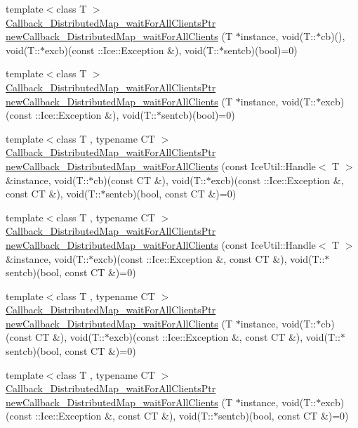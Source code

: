 \begin{DoxyCompactItemize}
\item 
{\footnotesize template$<$class T $>$ }\\\hyperlink{namespace_global_table_a110ac4602b8f6c72aa866923747317e3}{Callback\_\-DistributedMap\_\-waitForAllClientsPtr} \hyperlink{namespace_global_table_ac9ffe632ea55c9e7441c89ffc0d325c8}{newCallback\_\-DistributedMap\_\-waitForAllClients} (T $\ast$instance, void(T::$\ast$cb)(), void(T::$\ast$excb)(const ::Ice::Exception \&), void(T::$\ast$sentcb)(bool)=0)
\item 
{\footnotesize template$<$class T $>$ }\\\hyperlink{namespace_global_table_a110ac4602b8f6c72aa866923747317e3}{Callback\_\-DistributedMap\_\-waitForAllClientsPtr} \hyperlink{namespace_global_table_af0a542865c3fb884c9b5703eb6d9dece}{newCallback\_\-DistributedMap\_\-waitForAllClients} (T $\ast$instance, void(T::$\ast$excb)(const ::Ice::Exception \&), void(T::$\ast$sentcb)(bool)=0)
\item 
{\footnotesize template$<$class T , typename CT $>$ }\\\hyperlink{namespace_global_table_a110ac4602b8f6c72aa866923747317e3}{Callback\_\-DistributedMap\_\-waitForAllClientsPtr} \hyperlink{namespace_global_table_a34e1115638b17b73dc68dc06125520b1}{newCallback\_\-DistributedMap\_\-waitForAllClients} (const IceUtil::Handle$<$ T $>$ \&instance, void(T::$\ast$cb)(const CT \&), void(T::$\ast$excb)(const ::Ice::Exception \&, const CT \&), void(T::$\ast$sentcb)(bool, const CT \&)=0)
\item 
{\footnotesize template$<$class T , typename CT $>$ }\\\hyperlink{namespace_global_table_a110ac4602b8f6c72aa866923747317e3}{Callback\_\-DistributedMap\_\-waitForAllClientsPtr} \hyperlink{namespace_global_table_a200f0daaa6e176e4ee999d685777e3b7}{newCallback\_\-DistributedMap\_\-waitForAllClients} (const IceUtil::Handle$<$ T $>$ \&instance, void(T::$\ast$excb)(const ::Ice::Exception \&, const CT \&), void(T::$\ast$sentcb)(bool, const CT \&)=0)
\item 
{\footnotesize template$<$class T , typename CT $>$ }\\\hyperlink{namespace_global_table_a110ac4602b8f6c72aa866923747317e3}{Callback\_\-DistributedMap\_\-waitForAllClientsPtr} \hyperlink{namespace_global_table_a966c50ca20de1840682fcd9dd03c17a3}{newCallback\_\-DistributedMap\_\-waitForAllClients} (T $\ast$instance, void(T::$\ast$cb)(const CT \&), void(T::$\ast$excb)(const ::Ice::Exception \&, const CT \&), void(T::$\ast$sentcb)(bool, const CT \&)=0)
\item 
{\footnotesize template$<$class T , typename CT $>$ }\\\hyperlink{namespace_global_table_a110ac4602b8f6c72aa866923747317e3}{Callback\_\-DistributedMap\_\-waitForAllClientsPtr} \hyperlink{namespace_global_table_ab578b4a97a1d0a8d8507fd51c34cfab9}{newCallback\_\-DistributedMap\_\-waitForAllClients} (T $\ast$instance, void(T::$\ast$excb)(const ::Ice::Exception \&, const CT \&), void(T::$\ast$sentcb)(bool, const CT \&)=0)
\end{DoxyCompactItemize}


